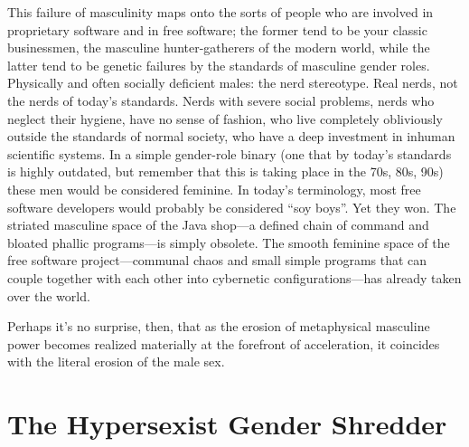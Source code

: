 \documentclass[10pt, statementpaper, twoside, openright]{memoir}
\begin{document}
This failure of masculinity maps onto the sorts of people who are involved in proprietary software and in free software; the former tend to be your classic businessmen, the masculine hunter-gatherers of the modern world, while the latter tend to be genetic failures by the standards of masculine gender roles. Physically and often socially deficient males: the nerd stereotype. Real nerds, not the nerds of today's standards. Nerds with severe social problems, nerds who neglect their hygiene, have no sense of fashion, who live completely obliviously outside the standards of normal society, who have a deep investment in inhuman scientific systems. In a simple gender-role binary (one that by today's standards is highly outdated, but remember that this is taking place in the 70s, 80s, 90s) these men would be considered feminine. In today's terminology, most free software developers would probably be considered ``soy boys''. Yet they won. The striated masculine space of the Java shop---a defined chain of command and bloated phallic programs---is simply obsolete. The smooth feminine space of the free software project---communal chaos and small simple programs that can couple together with each other into cybernetic configurations---has already taken over the world.

Perhaps it's no surprise, then, that as the erosion of metaphysical masculine power becomes realized materially at the forefront of acceleration, it coincides with the literal erosion of the male sex.

\chapter{The Hypersexist Gender Shredder}
\end{document}
